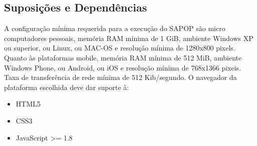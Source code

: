 \documentclass[
10pt, %
a4paper, %
oneside, %
headinclude,footinclude, %
BCOR5mm, %
]{scrartcl}
\begin{document}
\subsection{Suposições e Dependências}
A configuração mínima requerida para a execução do SAPOP são micro computadores pessoais, memória RAM mínima de 1 GiB, ambiente Windows XP ou superior, ou Linux, ou MAC-OS e resolução mínima de 1280x800 pixels. Quanto às plataformas mobile, memória RAM mínima de 512 MiB, ambiente Windows Phone, ou Android, ou iOS e resolução mínima de 768x1366 pixeis. Taxa de transferência de rede mínima de 512 Kib/segundo.
O navegador da plataforma escolhida deve dar suporte à:
\begin{itemize}[noitemsep]
	\item HTML5
	\item CSS3
	\item JavaScript >= 1.8
\end{itemize}
 





\end{document}
